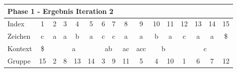 \begin{table}[H]
\centering
\begin{adjustbox}{max width=\textwidth}
\begin{tabular}{lccccccccccccccc}
\multicolumn{16}{l}{Phase 1 - Ergebnis Iteration 2}                                                                                                                                                                                                                                                                                                                                                                                              \\ \hline
\multicolumn{1}{l|}{Index}   & 1                       & 2                         & 3                         & 4                         & 5                       & 6                         & 7                                              & 8                         & 9                         & \cellcolor[HTML]{\green}10 & \cellcolor[HTML]{\green}11 & 12 & 13                        & 14                        & 15  \\
\multicolumn{1}{l|}{Zeichen} & c                       & a                         & a                         & b                         & a                       & c                         & c                                              & a                         & a                         & b                          & a                          & c  & a                         & a                         & \$  \\ \cline{1-16}
\multicolumn{1}{l|}{Kontext} & \multicolumn{1}{c|}{\$} & \multicolumn{4}{c|}{a}                                                                                      & \multicolumn{2}{c|}{\cellcolor[HTML]{\red}ab}                            & \multicolumn{1}{c|}{ac}   & \multicolumn{1}{c|}{acc}  & \multicolumn{2}{c|}{b}                                  & \multicolumn{4}{c}{c}                                            \\
\multicolumn{1}{l|}{Gruppe}      & \multicolumn{1}{c|}{15} & 2                         & 8                         & 13                        & \multicolumn{1}{c|}{14} & \cellcolor[HTML]{\red}3 & \multicolumn{1}{c|}{\cellcolor[HTML]{\red}9} & \multicolumn{1}{c|}{11}   & \multicolumn{1}{c|}{5}    & 4                          & \multicolumn{1}{c|}{10}    & 1  & 6                         & 7                         & 12  \\

\end{tabular}
\end{adjustbox}
\end{table}
